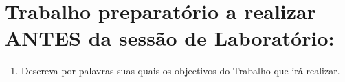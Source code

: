 \documentclass[a4paper,12pt]{article}  %
\begin{document}
\section{\sf Trabalho preparatório a realizar  ANTES da sessão de Laboratório:}
\begin{enumerate}
\item Descreva por palavras suas quais os objectivos do Trabalho que irá realizar.


\end{enumerate}
\noindent\underline{\makebox[\textwidth][r]{~}} \\
\noindent\underline{\makebox[\textwidth][r]{~}} \\
\noindent\underline{\makebox[\textwidth][r]{~}} \\
\noindent\underline{\makebox[\textwidth][r]{~}} \\
\noindent\underline{\makebox[\textwidth][r]{~}} \\
\noindent\underline{\makebox[\textwidth][r]{~}} \\
\noindent\underline{\makebox[\textwidth][r]{~}} \\
\end{document}
